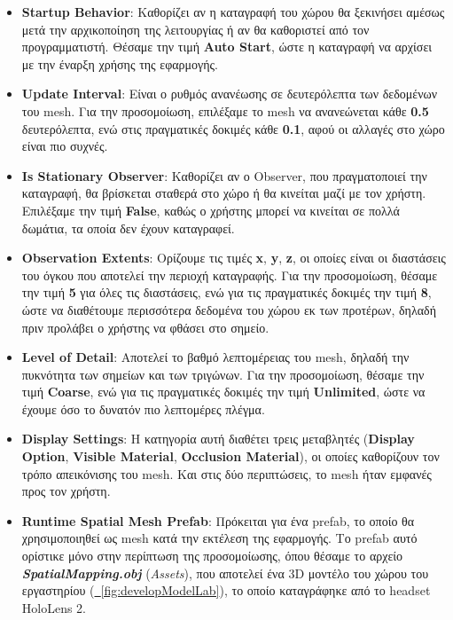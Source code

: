 \begin{itemize}
    \item \textbf{Startup Behavior}: Καθορίζει αν η καταγραφή του χώρου θα ξεκινήσει αμέσως μετά την αρχικοποίηση της λειτουργίας ή αν θα καθοριστεί από τον προγραμματιστή. Θέσαμε την τιμή \textbf{Auto Start}, ώστε η καταγραφή να αρχίσει με την έναρξη χρήσης της εφαρμογής.
    \item \textbf{Update Interval}: Είναι ο ρυθμός ανανέωσης σε δευτερόλεπτα των δεδομένων του mesh. Για την προσομοίωση, επιλέξαμε το mesh να ανανεώνεται κάθε \textbf{0.5} δευτερόλεπτα, ενώ στις πραγματικές δοκιμές κάθε \textbf{0.1}, αφού οι αλλαγές στο χώρο είναι πιο συχνές.
    \item \textbf{Is Stationary Observer}: Καθορίζει αν ο Observer, που πραγματοποιεί την καταγραφή, θα βρίσκεται σταθερά στο χώρο ή θα κινείται μαζί με τον χρήστη. Επιλέξαμε την τιμή \textbf{False}, καθώς ο χρήστης μπορεί να κινείται σε πολλά δωμάτια, τα οποία δεν έχουν καταγραφεί.
    \item \textbf{Observation Extents}: Ορίζουμε τις τιμές \textbf{x}, \textbf{y}, \textbf{z}, οι οποίες είναι οι διαστάσεις του όγκου που αποτελεί την περιοχή καταγραφής. Για την προσομοίωση, θέσαμε την τιμή \textbf{5} για όλες τις διαστάσεις, ενώ για τις πραγματικές δοκιμές την τιμή \textbf{8}, ώστε να διαθέτουμε περισσότερα δεδομένα του χώρου εκ των προτέρων, δηλαδή πριν προλάβει ο χρήστης να φθάσει στο σημείο.
    \item \textbf{Level of Detail}: Αποτελεί το βαθμό λεπτομέρειας του mesh, δηλαδή την πυκνότητα των σημείων και των τριγώνων. Για την προσομοίωση, θέσαμε την τιμή \textbf{Coarse}, ενώ για τις πραγματικές δοκιμές την τιμή \textbf{Unlimited}, ώστε να έχουμε όσο το δυνατόν πιο λεπτομέρες πλέγμα.
    \item \textbf{Display Settings}: Η κατηγορία αυτή διαθέτει τρεις μεταβλητές (\textbf{Display Option}, \textbf{Visible Material}, \textbf{Occlusion Material}), οι οποίες καθορίζουν τον τρόπο απεικόνισης του mesh. Και στις δύο περιπτώσεις, το mesh ήταν εμφανές προς τον χρήστη.
    \item \textbf{Runtime Spatial Mesh Prefab}: Πρόκειται για ένα prefab, το οποίο θα χρησιμοποιηθεί ως mesh κατά την εκτέλεση της εφαρμογής. Το prefab αυτό ορίστικε μόνο στην περίπτωση της προσομοίωσης, όπου θέσαμε το αρχείο \textbf{\textit{SpatialMapping.obj}} (\textit{Assets}), που αποτελεί ένα 3D μοντέλο του χώρου του εργαστηρίου (\hyperref[fig:developModelLab]{\schema~\ref*{fig:developModelLab}}), το οποίο καταγράφηκε από το headset HoloLens 2.
\end{itemize}

